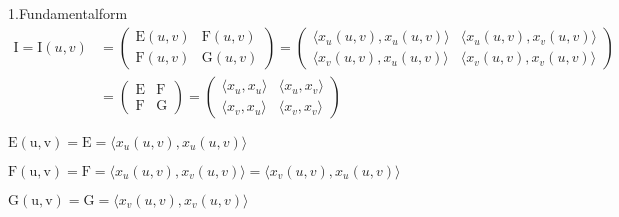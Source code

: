 \begin{titleDef}{1.Fundamentalform}
\label{1Fundamentalformshort}
\label{I}
\begin{align*}
\mathrm{I}=\mathrm{I}(u,v) &= 
    \begin{pmatrix} 
        \mathrm{E}(u,v) & \mathrm{F}(u,v)\\
        \mathrm{F}(u,v) & \mathrm{G}(u,v)
    \end{pmatrix} = 
    \begin{pmatrix} 
        \langle x_u(u,v),x_u(u,v)\rangle & \langle x_u(u,v),x_v(u,v)\rangle\\
        \langle x_v(u,v),x_u(u,v)\rangle & \langle x_v(u,v),x_v(u,v)\rangle
    \end{pmatrix} 
    \\
    &= \begin{pmatrix} 
        \mathrm{E} & \mathrm{F}\\
        \mathrm{F} & \mathrm{G}
    \end{pmatrix} =
    \begin{pmatrix} 
        \langle x_u,x_u\rangle & \langle x_u,x_v\rangle\\
        \langle x_v,x_u\rangle & \langle x_v,x_v\rangle
    \end{pmatrix}
\end{align*}
\end{titleDef}

\begin{rawDef}
\label{E}
$\mathrm{E(u,v)} = \mathrm{E} = \langle x_u(u,v),x_u(u,v)\rangle$
\end{rawDef}

\begin{rawDef}
\label{F}
$\mathrm{F(u,v)} = \mathrm{F} = \langle x_u(u,v),x_v(u,v)\rangle = \langle x_v(u,v),x_u(u,v)\rangle$
\end{rawDef}

\begin{rawDef}
\label{G}
$\mathrm{G(u,v)} = \mathrm{G} = \langle x_v(u,v),x_v(u,v)\rangle$
\end{rawDef}

